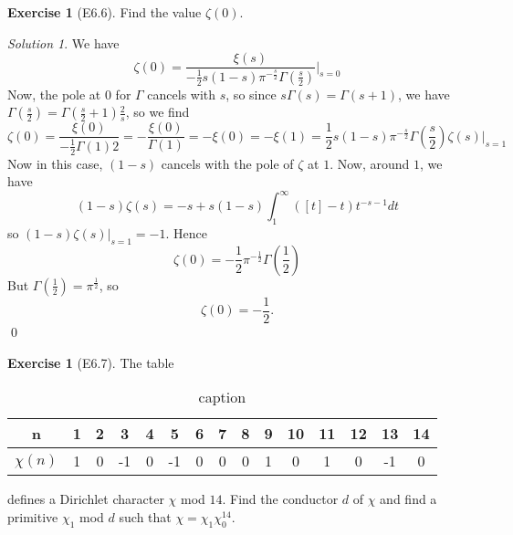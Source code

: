\documentclass[reqno]{amsart}
\theoremstyle{definition}
\newtheorem{exercise}[theorem]{Exercise}
\theoremstyle{remark}
\newtheorem*{solution}{Solution}
\begin{document}
\begin{exercise}[E6.6]
    Find the value $\zeta (0)$.
\end{exercise}

\begin{solution}
    We have
    \[
    \zeta(0) = 
    \frac{\xi (s)}{-\frac{1}{2} s(1-s) \pi^{-\frac{s}{2}}
    \Gamma(\frac{s}{2})} \bigg|_{s=0}
    \] 
    Now, the pole at $0$ for $\Gamma$ cancels with $s$, so
    since $s \Gamma(s) = \Gamma(s+1)$, we have
    $\Gamma\left( \frac{s}{2} \right) 
    = \Gamma \left( \frac{s}{2}+1 \right) \frac{2}{s}$, so
    we find
    \[
    \zeta(0) = 
    \frac{\xi (0)}{-\frac{1}{2} \Gamma(1) 2}
    = - \frac{\xi(0)}{\Gamma(1)} = -\xi(0)
    = - \xi (1)
    = \frac{1}{2} s (1-s) \pi^{-\frac{s}{2}}\Gamma(\frac{s}{2})
    \zeta(s) \bigg|_{s=1}
    \] 
    Now
    in this case, $(1-s)$ cancels with the pole of
    $\zeta$ at $1$. 
    Now, around $1$, we have
    \[
        (1-s)\zeta(s) = 
        -s + s (1-s) 
        \int_{1}^{\infty} \left( \left[ t \right] -t \right) 
        t^{-s-1} dt
    \] 
    so $(1-s)\zeta(s) \bigg|_{s=1} = -1$.
    Hence
    \[
    \zeta(0) = -\frac{1}{2} \pi^{-\frac{1}{2}}
    \Gamma(\frac{1}{2})
    \] 
    But $\Gamma(\frac{1}{2}) = \pi^{\frac{1}{2}}$, so
    \[
    \zeta(0) = - \frac{1}{2}.
    \] 
    \qed
\end{solution}

\begin{exercise}[E6.7]
    The table
    \begin{table}[htpb]
        \centering
        \caption{caption}
        \label{tab:label}
        \begin{tabular}{c | c c c c c c c c c c c c c c}
            n & 1 & 2 & 3 & 4 & 5 & 6 & 7 & 8 & 9 & 10 & 11 & 12
              & 13 & 14 \\
              \hline
            $\chi(n)$ & 1 & 0 & -1 & 0 & -1 & 0 & 0 & 0 & 1 & 0 & 1
            & 0 & -1 & 0
        \end{tabular}
    \end{table}
    defines a Dirichlet character 
    $\chi$ mod $14$. Find the
    conductor $d$ of $\chi$ and find a primitive
    $\chi_1$ mod $d$ such that
    $\chi = \chi_1 \chi_0^{14}$.

\end{exercise}
\end{document}
